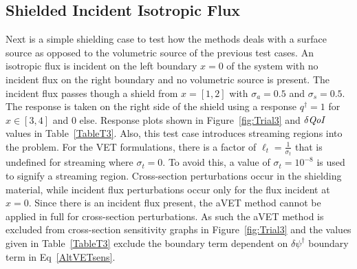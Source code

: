 \documentclass[12pt]{report}
\newcommand{\sigt}{\sigma_t}
\newcommand{\sigs}{\sigma_s}
\newcommand{\siga}{\sigma_a}
\newcommand{\isigt}{\ell_t}
\newcommand{\qoi}{{\it QoI}\xspace}
\begin{document}
\subsection{Shielded Incident Isotropic Flux}

Next is a simple shielding case to test how the methods deals with a surface source as opposed to the volumetric source of the previous test cases. An isotropic flux is incident on the left boundary $x=0$ of the system with no incident flux on the right boundary and no volumetric source is present. The incident flux passes though a shield from $x=[1,2]$ with $\siga=0.5$ and $\sigs=0.5$. The response is taken on the right side of the shield using a response $q^\dag=1$ for $x \in [3,4]$ and $0$ else. Response plots shown in Figure~\ref{fig:Trial3} and $\delta \qoi$ values in Table~\ref{TableT3}. Also, this test case introduces streaming regions into the problem. For the VET formulations, there is a factor of $\isigt=\frac{1}{\sigt}$ that is undefined for streaming where $\sigt=0$. To avoid this, a value of $\sigt=10^{-8}$ is used to signify a streaming region. Cross-section perturbations occur in the shielding material, while incident flux perturbations occur only for the flux incident at $x=0$. Since there is an incident flux present, the aVET method cannot be applied in full for cross-section perturbations. As such the aVET method is excluded from cross-section sensitivity graphs in Figure~\ref{fig:Trial3} and the values given in Table~\ref{TableT3} exclude the boundary term dependent on $\delta \psi^\dag$ boundary term in Eq~\ref{AltVETsens}.
\end{document}
